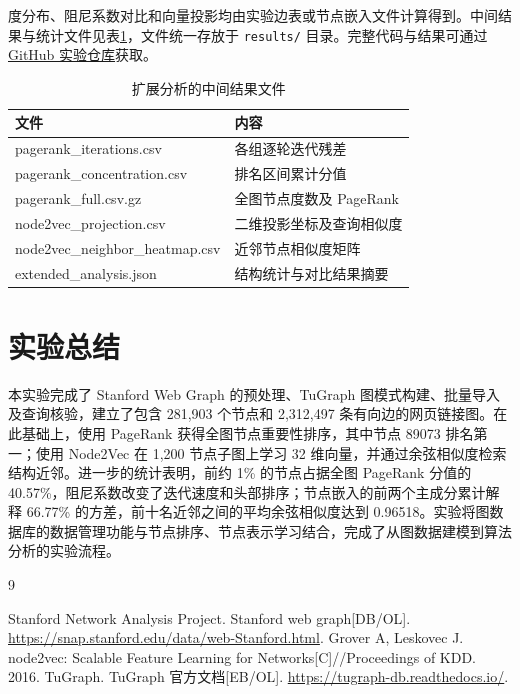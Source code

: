 \documentclass[UTF8,a4paper,12pt,fontset=windows]{ctexart}
\begin{document}
度分布、阻尼系数对比和向量投影均由实验边表或节点嵌入文件计算得到。中间结果与统计文件见表\ref{tab:analysisfiles}，文件统一存放于 \texttt{results/} 目录。完整代码与结果可通过\href{https://github.com/MuonChaser/tugraph-homework-2}{GitHub 实验仓库}获取。
\begin{table}[H]
\centering
\caption{扩展分析的中间结果文件}\label{tab:analysisfiles}
\begin{tabularx}{\textwidth}{>{\ttfamily\small}l X}
\toprule
文件 & 内容\\
\midrule
pagerank\_iterations.csv & 各组逐轮迭代残差\\
pagerank\_concentration.csv & 排名区间累计分值\\
pagerank\_full.csv.gz & 全图节点度数及 PageRank\\
node2vec\_projection.csv & 二维投影坐标及查询相似度\\
node2vec\_neighbor\_heatmap.csv & 近邻节点相似度矩阵\\
extended\_analysis.json & 结构统计与对比结果摘要\\
\bottomrule
\end{tabularx}
\end{table}

\section{实验总结}
本实验完成了 Stanford Web Graph 的预处理、TuGraph 图模式构建、批量导入及查询核验，建立了包含 281,903 个节点和 2,312,497 条有向边的网页链接图。在此基础上，使用 PageRank 获得全图节点重要性排序，其中节点 89073 排名第一；使用 Node2Vec 在 1,200 节点子图上学习 32 维向量，并通过余弦相似度检索结构近邻。进一步的统计表明，前约 1\% 的节点占据全图 PageRank 分值的 40.57\%，阻尼系数改变了迭代速度和头部排序；节点嵌入的前两个主成分累计解释 66.77\% 的方差，前十名近邻之间的平均余弦相似度达到 0.96518。实验将图数据库的数据管理功能与节点排序、节点表示学习结合，完成了从图数据建模到算法分析的实验流程。

\begin{thebibliography}{9}
\raggedright
{}
 Stanford Network Analysis Project. Stanford web graph[DB/OL]. \url{https://snap.stanford.edu/data/web-Stanford.html}.
 Grover A, Leskovec J. node2vec: Scalable Feature Learning for Networks[C]//Proceedings of KDD. 2016.
 TuGraph. TuGraph 官方文档[EB/OL]. \url{https://tugraph-db.readthedocs.io/}.
\end{thebibliography}
\end{document}
